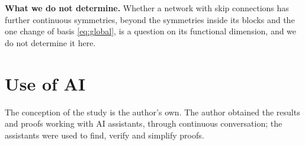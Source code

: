 \documentclass[10pt]{article}
\theoremstyle{definition}
\theoremstyle{remark}
\newcommand{\para}[1]{\smallskip\noindent\textbf{#1}\hspace{0.5em}}
\begin{document}
\para{What we do not determine.} Whether a network with skip connections has further continuous symmetries, beyond the symmetries inside its blocks and the one change of basis \eqref{eq:global}, is a question on its functional dimension, and we do not determine it here.

\section*{Use of AI}
The conception of the study is the author's own. The author obtained the results and proofs working with AI assistants, through continuous conversation; the assistants were used to find, verify and simplify proofs.
\end{document}
